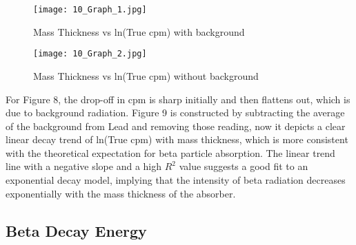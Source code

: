 \documentclass[11pt]{article}
\begin{document}
	\begin{figure}[htbp]
		\centering
		\begin{minipage}{0.45\textwidth}
			\centering
			\texttt{[image: 10\_Graph\_1.jpg]}
			\caption{\centering Mass Thickness vs ln(True cpm) with background}
			\label{fig:10_Graph_1}
		\end{minipage}
		\hfill
		\begin{minipage}{0.45\textwidth}
			\centering
			\texttt{[image: 10\_Graph\_2.jpg]}
			\caption{\centering Mass Thickness vs ln(True cpm) without background}
			\label{fig:10_Graph_2}
		\end{minipage}
	\end{figure}
	
	For Figure 8, the drop-off in cpm is sharp initially and then flattens out, which is due to background radiation. Figure 9 is constructed by subtracting the average of the background from Lead and removing those reading, now it depicts a clear linear decay trend of ln(True cpm) with mass thickness, which is more consistent with the theoretical expectation for beta particle absorption. The linear trend line with a negative slope and a high \( R^2 \) value suggests a good fit to an exponential decay model, implying that the intensity of beta radiation decreases exponentially with the mass thickness of the absorber.
	
	
\clearpage
	
	\subsection{Beta Decay Energy}
	
\end{document}
